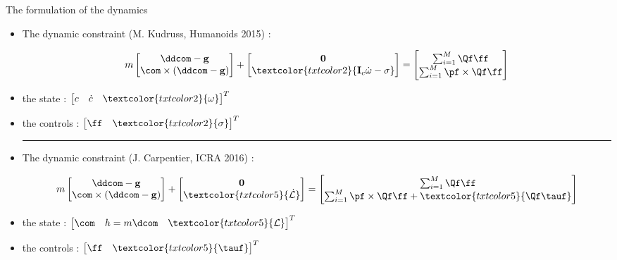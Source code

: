 \begin{frame}{The formulation of the dynamics}

\begin{itemize}

\item The dynamic constraint \textcolor{txtcolor2}{(M. Kudruss, Humanoids 2015)} :
\begin{scriptsize}
\begin{align*}
  m
  \begin{bmatrix}
  \ddcom - {\bf g} \\
  \com \times (\ddcom - {\bf g})
  \end{bmatrix}
  +
  \begin{bmatrix}
   {\bf 0} \\
     \textcolor{txtcolor2}{{\bf I}_c \dot{\omega} - \sigma}
  \end{bmatrix}
  =
  \begin{bmatrix}
  \sum_{i=1}^{M}
  \Qf \ff \\
  \sum_{i=1}^{M}
  \pf \times \Qf  \ff
  \end{bmatrix}
\end{align*}
\end{scriptsize}
\item the state :
$
\begin{bmatrix}
c & \dot{c} & \textcolor{txtcolor2}{\omega}
\end{bmatrix}^T
$
\item the controls :
$
\begin{bmatrix}
\ff & \textcolor{txtcolor2}{\sigma}
\end{bmatrix}^T
$

\textcolor{txtcolor1}{\hrule}
\vspace*{0.5cm}

\item The dynamic constraint \textcolor{txtcolor5}{(J. Carpentier, ICRA 2016)} :
\begin{scriptsize}
\begin{align*}
  m
  \begin{bmatrix}
  \ddcom - {\bf g} \\
  \com \times (\ddcom - {\bf g})
  \end{bmatrix}
  +
  \begin{bmatrix}
   {\bf 0} \\
   \textcolor{txtcolor5}{ \dot{\mathcal{L}} }
  \end{bmatrix}
  =
  \begin{bmatrix}
  \sum_{i=1}^{M}
  \Qf \ff \\
  \sum_{i=1}^{M}
  \pf \times \Qf  \ff +
  \textcolor{txtcolor5}{ \Qf \tauf}
  \end{bmatrix}
\end{align*}
\end{scriptsize}
\item the state :
$
\begin{bmatrix}
\com & h=m\dcom & \textcolor{txtcolor5}{\mathcal{L}}
\end{bmatrix}^T
$
\item the controls :
$
\begin{bmatrix}
\ff & \textcolor{txtcolor5}{\tauf}
\end{bmatrix}^T
$


\end{itemize}
\end{frame}
